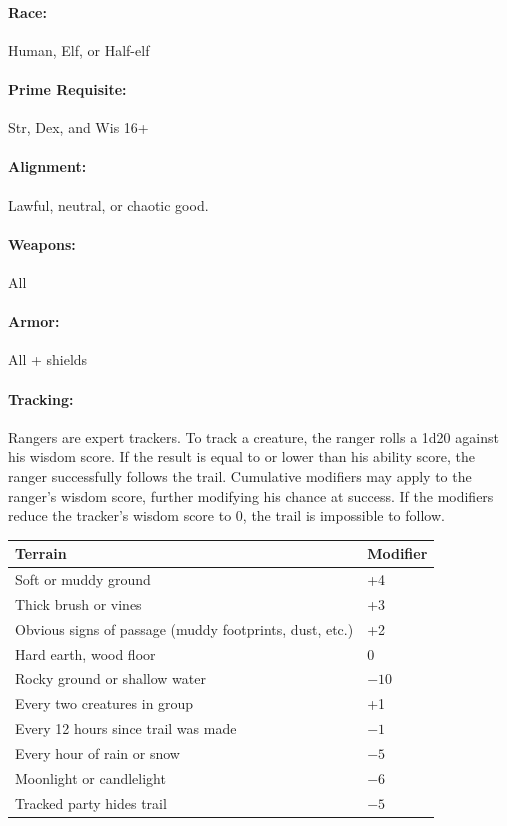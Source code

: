 \begin{multicols}{2}
\paragraph{Race:} Human, Elf, or Half-elf

\paragraph{Prime Requisite:} Str, Dex, and Wis 16+

\paragraph{Alignment:} Lawful, neutral, or chaotic good.

\paragraph{Weapons:} All

\paragraph{Armor:} All + shields

\paragraph{Tracking:} Rangers are expert trackers.  To track a creature, the ranger rolls a 1d20 against his wisdom score.  If the result is equal to or lower than his ability score, the ranger successfully follows the trail.  Cumulative modifiers may apply to the ranger's wisdom score, further modifying his chance at success.  If the modifiers reduce the tracker's wisdom score to 0, the trail is impossible to follow.

\noindent
\begin{minipage}{\columnwidth}

\label{trackingmods}
\noindent
\begin{tabular}{|m{}|m{}|}
\hline
Terrain	& Modifier \\
\hline\hline
\rowcolor[gray]{.9}Soft or muddy ground	& +4 \\
Thick brush or vines	& +3 \\
\rowcolor[gray]{.9}Obvious signs of passage (muddy footprints, dust, etc.)	& +2 \\
Hard earth, wood floor	& 0 \\
\rowcolor[gray]{.9}Rocky ground or shallow water	& $-10$ \\
Every two creatures in group	& +1 \\
\rowcolor[gray]{.9}Every 12 hours since trail was made	& $-1$ \\
Every hour of rain or snow	& $-5$ \\
\rowcolor[gray]{.9}Moonlight or candlelight	& $-6$ \\
Tracked party hides trail	& $-5$ \\
\hline
\end{tabular}


\end{minipage}
\end{multicols}
